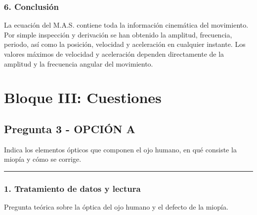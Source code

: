 \subsubsection*{6. Conclusión}
\begin{cajaconclusion}
La ecuación del M.A.S. contiene toda la información cinemática del movimiento. Por simple inspección y derivación se han obtenido la amplitud, frecuencia, periodo, así como la posición, velocidad y aceleración en cualquier instante. Los valores máximos de velocidad y aceleración dependen directamente de la amplitud y la frecuencia angular del movimiento.
\end{cajaconclusion}

\newpage

\section{Bloque III: Cuestiones}
\label{sec:optica_2008_sep_ext}

\subsection{Pregunta 3 - OPCIÓN A}
\label{subsec:3A_2008_sep_ext}

\begin{cajaenunciado}
Indica los elementos ópticos que componen el ojo humano, en qué consiste la miopía y cómo se corrige.
\end{cajaenunciado}
\hrule

\subsubsection*{1. Tratamiento de datos y lectura}
Pregunta teórica sobre la óptica del ojo humano y el defecto de la miopía.

